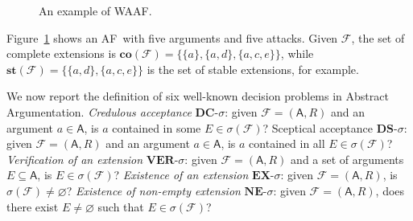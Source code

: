 \documentclass[conference,compsocconf]{IEEEtran}
\newcommand{\AF}{\ensuremath{\mathcal{F}}\xspace} %
\newcommand{\F}{\ensuremath{\mathcal{F}}\xspace} %
\newcommand{\args}{\ensuremath{\mathsf{A}}\xspace} %
\newcommand{\atts}{\ensuremath{R}\xspace}
\newcommand{\AFC}{\ensuremath{\AF=(\args,\atts)}\xspace} %
\newcommand{\af}{AF}
\newcommand{\co}{\mathbf{co}}
\newcommand{\st}{\mathbf{st}}
\newcommand{\dc}{\mathbf{DC}}
\newcommand{\ds}{\mathbf{DS}}
\newcommand{\ex}{\mathbf{EX}}
\newcommand{\nem}{\mathbf{NE}}
\begin{document}
\begin{figure}[t]
	\centering
	\vspace{-0.3cm}
	\caption{An example of  WAAF.}\label{fig:argnetex}
\end{figure}


Figure~\ref{fig:argnetex} shows an \af \, with five arguments and five attacks. Given $\F$, the set of complete extensions is $\co(\F) = \{\{a\}, \{a,d\}, \{a, c,e\}\}$, while $\st(\F) = \{\{a,d\}, \{a, c,e\}\}$ is the set of stable extensions, for example. %



We  now report  the definition of six well-known decision problems in Abstract Argumentation.
\emph{Credulous acceptance} $\dc\textit{-}\sigma$: given \AFC and an argument $a \in \args$, is $a$ contained in some $E \in \sigma(\F)$?
Sceptical acceptance $\ds\textit{-}\sigma$: given \AFC and an argument $a \in \args$, is $a$ contained in all $E \in \sigma(\F)$?
\emph{Verification of an extension} $\mathit{\textbf{VER}}\textit{-}\sigma$: given \AFC and a set of arguments $E \subseteq \args$, is $E \in \sigma(\F)$?
\emph{Existence of an extension} $\ex\textit{-}\sigma$: given \AFC, is
$\sigma(\F) \not= \varnothing$?
\emph{Existence of non-empty extension}
$\nem\textit{-}\sigma$: given \AFC, does there exist $E
\not= \varnothing$ such that $E \in \sigma(\F)$?
\end{document}

